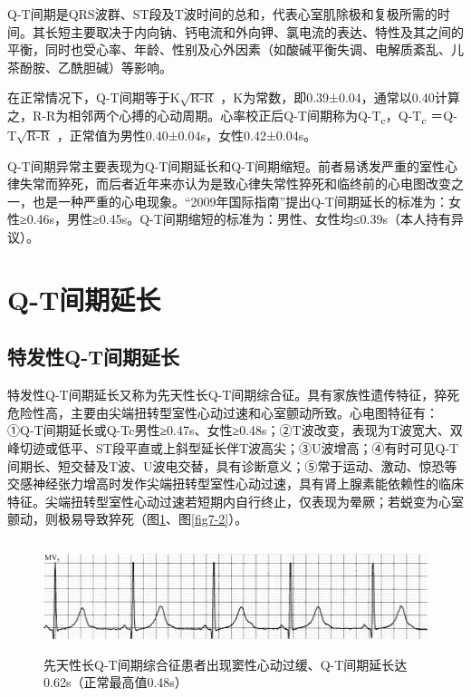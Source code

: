Q-T间期是QRS波群、ST段及T波时间的总和，代表心室肌除极和复极所需的时间。其长短主要取决于内向钠、钙电流和外向钾、氯电流的表达、特性及其之间的平衡，同时也受心率、年龄、性别及心外因素（如酸碱平衡失调、电解质紊乱、儿茶酚胺、乙酰胆碱）等影响。

在正常情况下，Q-T间期等于K$\sqrt{\text{R-R}}$
，K为常数，即0.39±0.04，通常以0.40计算之，R-R为相邻两个心搏的心动周期。心率校正后Q-T间期称为Q-T\textsubscript{c}，Q-T\textsubscript{c} ＝Q-T$\sqrt{\text{R-R}}$
，正常值为男性0.40±0.04s，女性0.42±0.04s。

Q-T间期异常主要表现为Q-T间期延长和Q-T间期缩短。前者易诱发严重的室性心律失常而猝死，而后者近年来亦认为是致心律失常性猝死和临终前的心电图改变之一，也是一种严重的心电现象。“2009年国际指南”提出Q-T间期延长的标准为：女性≥0.46s，男性≥0.45s。Q-T间期缩短的标准为：男性、女性均≤0.39s（本人持有异议）。

\protect\hypertarget{text00013.htmlux5cux23subid101}{}{}

\section{Q-T间期延长}

\protect\hypertarget{text00013.htmlux5cux23subid102}{}{}

\subsection{特发性Q-T间期延长}

特发性Q-T间期延长又称为先天性长Q-T间期综合征。具有家族性遗传特征，猝死危险性高，主要由尖端扭转型室性心动过速和心室颤动所致。心电图特征有：①Q-T间期延长或Q-Tc男性≥0.47s、女性≥0.48s；②T波改变，表现为T波宽大、双峰切迹或低平、ST段平直或上斜型延长伴T波高尖；③U波增高；④有时可见Q-T间期长、短交替及T波、U波电交替，具有诊断意义；⑤常于运动、激动、惊恐等交感神经张力增高时发作尖端扭转型室性心动过速，具有肾上腺素能依赖性的临床特征。尖端扭转型室性心动过速若短期内自行终止，仅表现为晕厥；若蜕变为心室颤动，则极易导致猝死（图\ref{fig7-1}、图\ref{fig7-2}）。

\begin{figure}[!htbp]
 \centering
 \includegraphics[width=5.78125in,height=1.27083in]{./images/Image00114.jpg}
 \captionsetup{justification=centering}
 \caption{先天性长Q-T间期综合征患者出现窦性心动过缓、Q-T间期延长达0.62s（正常最高值0.48s）}
 \label{fig7-1}
  \end{figure} 

